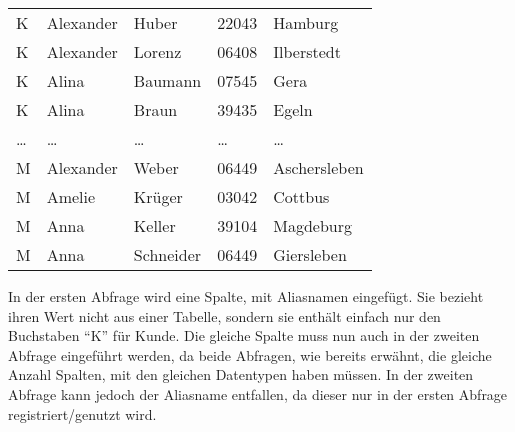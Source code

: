           \begin{center}
            \begin{small}
              \tablehead{}
              \begin{msoraclesql}
                \begin{supertabular}{lllll}
                  K & Alexander & Huber & 22043 & Hamburg \\
                  K & Alexander & Lorenz & 06408 & Ilberstedt \\
                  K & Alina & Baumann & 07545 & Gera \\
                  K & Alina & Braun & 39435 & Egeln \\
                  \dots & \dots & \dots & \dots & \dots \\
                  M & Alexander & Weber & 06449 & Aschersleben \\
                  M & Amelie & Krüger & 03042 & Cottbus \\
                  M & Anna & Keller & 39104 & Magdeburg \\
                  M & Anna & Schneider & 06449 & Giersleben \\
                \end{supertabular}
              \end{msoraclesql}
            \end{small}
          \end{center}
          In der ersten Abfrage wird eine Spalte, mit Aliasnamen  eingefügt. Sie bezieht ihren Wert nicht aus einer Tabelle, sondern sie enthält einfach nur den Buchstaben \enquote{K} für Kunde. Die gleiche Spalte muss nun auch in der zweiten Abfrage eingeführt werden, da beide Abfragen, wie bereits erwähnt, die gleiche Anzahl Spalten, mit den gleichen Datentypen haben müssen. In der zweiten Abfrage kann jedoch der Aliasname entfallen, da dieser nur in der ersten Abfrage registriert/genutzt wird.
